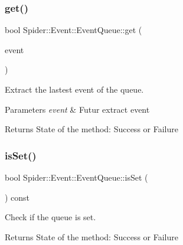 \subsubsection{\texorpdfstring{get()}{get()}}
{\footnotesize\ttfamily bool Spider\+::\+Event\+::\+Event\+Queue\+::get (\begin{DoxyParamCaption}\item[{std\+::shared\+\_\+ptr$<$ \hyperlink{class_spider_1_1_event_1_1_i_event}{I\+Event} $>$ \&}]{event }\end{DoxyParamCaption})}



Extract the lastest event of the queue. 


\begin{DoxyParams}{Parameters}
{\em event} & Futur extract event \\
\hline
\end{DoxyParams}
\begin{DoxyReturn}{Returns}
State of the method\+: Success or Failure 
\end{DoxyReturn}
\mbox{\label{class_spider_1_1_event_1_1_event_queue_a99fe9f809cb314a0516dcd4fab4f4b20}} 
\subsubsection{\texorpdfstring{is\+Set()}{isSet()}}
{\footnotesize\ttfamily bool Spider\+::\+Event\+::\+Event\+Queue\+::is\+Set (\begin{DoxyParamCaption}{ }\end{DoxyParamCaption}) const\hspace{0.3cm}{\ttfamily [inline]}}



Check if the queue is set. 

\begin{DoxyReturn}{Returns}
State of the method\+: Success or Failure 
\end{DoxyReturn}
\mbox{\label{class_spider_1_1_event_1_1_event_queue_a6946c1cc04ef2b83aaa84f70d1721a30}} 
